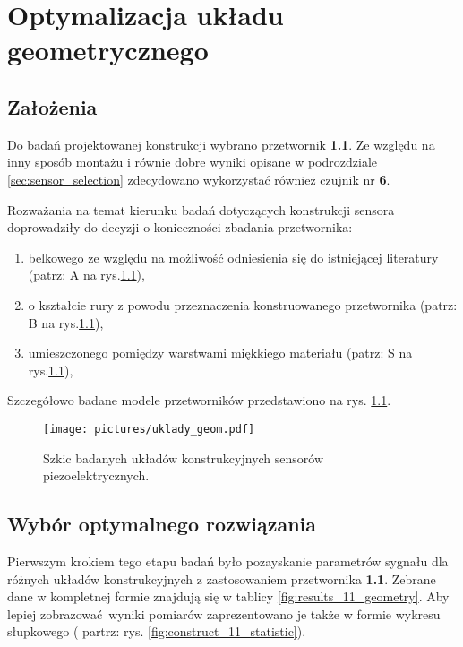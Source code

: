 \chapter{Optymalizacja układu geometrycznego}
\label{sec:construction_optymization}

\newcommand{\tabhead}[1]{\textbf{#1}}

\section{Założenia}
\label{sec:construction_asumptions}

Do badań projektowanej konstrukcji wybrano przetwornik \textbf{1.1}. Ze względu na inny sposób montażu
i równie dobre wyniki opisane w podrozdziale \ref{sec:sensor_selection} zdecydowano wykorzystać również
czujnik nr \textbf{6}.

Rozważania na temat kierunku badań dotyczących konstrukcji sensora 
doprowadziły do decyzji o konieczności zbadania przetwornika:
\begin{enumerate}
\item belkowego ze względu na możliwość odniesienia się do istniejącej literatury
\cite{belkowy_sensor}(patrz: A na rys.\ref{fig:construct_scetch}),
\item o kształcie rury z powodu przeznaczenia konstruowanego przetwornika (patrz: B na rys.\ref{fig:construct_scetch}),
\item umieszczonego pomiędzy warstwami miękkiego materiału (patrz: S na rys.\ref{fig:construct_scetch}),
\end{enumerate}
Szczegółowo badane modele przetworników przedstawiono na rys. \ref{fig:construct_scetch}.

\begin{figure}[bthp]
\centering
\texttt{[image: pictures/uklady\_geom.pdf]}
\caption{Szkic badanych układów konstrukcyjnych sensorów piezoelektrycznych.}
\label{fig:construct_scetch}
\end{figure}


\pagebreak
\section{Wybór optymalnego rozwiązania}
\label{construction_selection}

\indent Pierwszym krokiem tego etapu badań było pozayskanie parametrów sygnału dla
różnych układów konstrukcyjnych z zastosowaniem przetwornika \textbf{1.1}. Zebrane
dane w kompletnej formie znajdują się w tablicy \ref{fig:results_11_geometry}. Aby
lepiej zobrazować wyniki pomiarów zaprezentowano je także w formie wykresu słupkowego
( partrz: rys. \ref{fig:construct_11_statistic}). 


